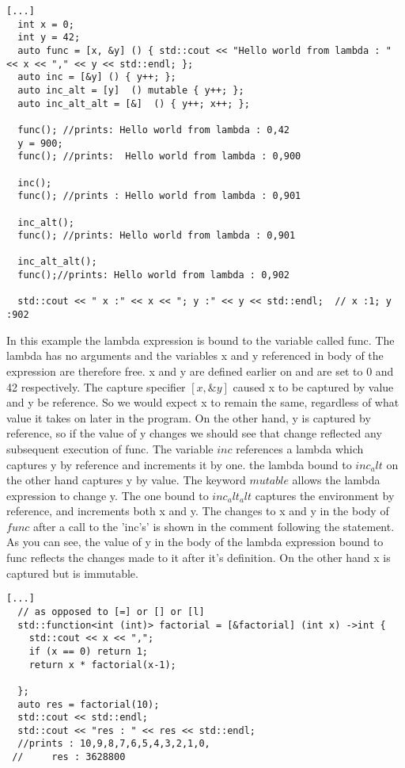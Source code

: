 \documentclass[12pt,fleqn]{article}
\begin{document}
\begin{lstlisting}
[...]
  int x = 0;
  int y = 42;
  auto func = [x, &y] () { std::cout << "Hello world from lambda : " << x << "," << y << std::endl; };
  auto inc = [&y] () { y++; };
  auto inc_alt = [y]  () mutable { y++; };
  auto inc_alt_alt = [&]  () { y++; x++; };

  func(); //prints: Hello world from lambda : 0,42
  y = 900;
  func(); //prints:  Hello world from lambda : 0,900

  inc();
  func(); //prints : Hello world from lambda : 0,901

  inc_alt();
  func(); //prints: Hello world from lambda : 0,901

  inc_alt_alt(); 
  func();//prints: Hello world from lambda : 0,902

  std::cout << " x :" << x << "; y :" << y << std::endl;  // x :1; y :902

\end{lstlisting}
In this example the lambda expression is bound to the  variable called func. 
The lambda has no arguments and the variables  x and y referenced in body of the expression are therefore free. 
x and y are defined earlier on and are set to 0 and 42 respectively. The capture specifier $[x,\&y]$ caused x to be captured by value and y be reference.
So we would expect x to remain the same, regardless of what value it takes on later in the program. 
On the other hand, y is captured by reference, so if the value of y changes we should see that change reflected any subsequent execution of func.
The variable $inc$ references a lambda which captures y by reference and increments it by one.
the lambda bound to $inc_alt$ on the other hand captures y by value. The keyword $mutable$ allows the lambda expression to change y.
The one bound to $inc_alt_alt$ captures the environment by reference, and increments both x and y.
The changes to x and y in the body of $func$ after a call to the 'inc's' is shown in the comment following the statement.
As you can see, the value of y in the body of the lambda expression bound to func reflects the changes made to it after it's definition. On the other hand x is captured but is immutable.

\begin{lstlisting}
[...]
  // as opposed to [=] or [] or [l]
  std::function<int (int)> factorial = [&factorial] (int x) ->int {
    std::cout << x << ",";
    if (x == 0) return 1;
    return x * factorial(x-1);
    
  };
  auto res = factorial(10);
  std::cout << std::endl;
  std::cout << "res : " << res << std::endl;
  //prints : 10,9,8,7,6,5,4,3,2,1,0,
 //     res : 3628800
\end{lstlisting}
\end{document}
